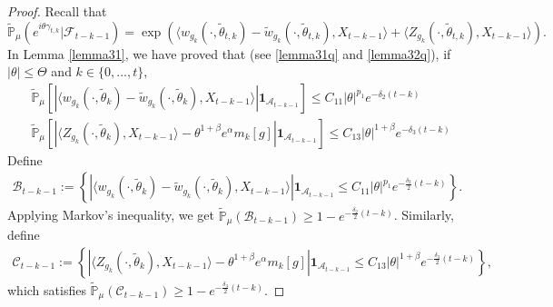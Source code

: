 \documentclass[12pt, a4paper]{amsart}
\theoremstyle{definition}
\numberwithin{equation}{section}
\begin{document}
\begin{proof}
    Recall that
    $$\mathbb{\tilde{P}}_{\mu}\left(e^{i\theta \gamma_{t,k}}|\mathcal{F}_{t-k-1}\right)=\exp(\langle w_{g_k}(\cdot,\tilde{\theta}_{t,k})-\tilde{w}_{g_k}(\cdot, \tilde{\theta}_{t,k}),X_{t-k-1}\rangle+\langle Z_{g_k}(\cdot,\tilde{\theta}_{t,k}),X_{t-k-1}\rangle).$$
    In Lemma \ref{lemma31}, we have proved that (see \eqref{lemma31q} and \eqref{lemma32q}), if $|\theta|\leq\Theta$ and $k\in\{0,...,t\}$,
    \begin{align*}
        &\mathbb{\tilde{P}}_{\mu}\left[\left|\langle w_{g_k}(\cdot,\tilde{\theta}_k)-\tilde{w}_{g_k}(\cdot,\tilde{\theta}_k), X_{t-k-1}\rangle\right|\mathbf{1}_{\mathcal{A}_{t-k-1}}\right]\leq C_{11}|\theta|^{p_1} e^{-\delta_2 (t-k)}\\
        &\mathbb{\tilde{P}}_{\mu}\left[\left|\langle Z_{g_k}(\cdot,\tilde{\theta}_k),X_{t-k-1}\rangle-\theta^{1+\beta}e^{\alpha}m_k[g]\right|\mathbf{1}_{\mathcal{A}_{t-k-1}}\right]\leq C_{13}|\theta|^{1+\beta} e^{-\delta_3(t-k)}
    \end{align*}
 Define
\begin{align*}
    \mathcal{B}_{t-k-1}:=\left\{\left|\langle w_{g_k}(\cdot,\tilde{\theta}_k)-\tilde{w}_{g_k}(\cdot,\tilde{\theta}_k), X_{t-k-1}\rangle\right|\mathbf{1}_{\mathcal{A}_{t-k-1}}\leq C_{11}|\theta|^{p_1} e^{-\frac{\delta_2}{2}(t-k)}\right\}.
\end{align*}
Applying Markov's inequality, we get $\mathbb{\tilde{P}}_{\mu}(\mathcal{B}_{t-k-1})\geq 1- e^{-\frac{\delta_2}{2}(t-k)}$. Similarly, define
\begin{align*}
    \mathcal{C}_{t-k-1}:=\left\{\left|\langle Z_{g_k}(\cdot,\tilde{\theta}_k),X_{t-k-1}\rangle-\theta^{1+\beta}e^{\alpha}m_k[g]\right|\mathbf{1}_{\mathcal{A}_{t-k-1}}\leq C_{13}|\theta|^{1+\beta} e^{-\frac{\delta_3}{2}(t-k)}\right\},
\end{align*}
 which satisfies  $\mathbb{\tilde{P}}_{\mu}(\mathcal{C}_{t-k-1})\geq 1- e^{-\frac{\delta_3}{2}(t-k)}$.


\end{proof}
\end{document}
